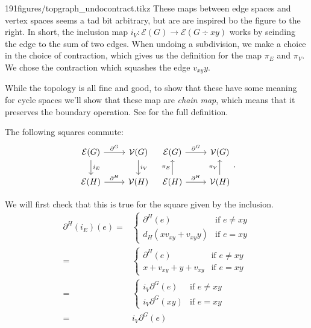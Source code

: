     
\begin{paragraphfigureenv}{191figures/topgraph_undocontract.tikz}
    These maps between edge spaces and vertex spaces seems a tad bit arbitrary, but are are inspired bo the figure to the right. In short, the inclusion map $i_V: \mathcal E(G)\to \mathcal E(G\div xy)$ works by seinding the edge  to the sum of two edges. 
     When undoing a subdivision, we make a choice in the choice of contraction, which gives us the definition for the map $\pi_E$ and $\pi_V$. 
    We chose the contraction which squashes the edge $v_{xy}y$. 
    \end{paragraphfigureenv}
    While the topology is all fine and good, to show that these have some meaning for cycle spaces we'll show that these map are \emph{chain map}, which means that it preserves the boundary operation. See  for the full definition.
    \begin{claim} The following squares commute: \label{claim:graphchainmap}
     \[\begin{tikzcd}
    \mathcal E(G)\arrow{r}{\partial^G} \arrow{d}{i_E} & \mathcal V(G) \arrow{d}{i_V}\\
    \mathcal E(H)\arrow{r}{\partial^H} & \mathcal V(H)
    \end{tikzcd}\;\;\;\begin{tikzcd}
    \mathcal E(G)\arrow{r}{\partial^G}& \mathcal V(G) \\
    \mathcal E(H)\arrow{r}{\partial^H} \arrow{u}{\pi_E}  & \mathcal V(H) \arrow{u}{\pi_V}
    \end{tikzcd}.\]
    \end{claim}
    We will first check that this is true for the square given by the inclusion.\\
    \begin{align*}
    \partial^H(i_E)(e)=& \left\{\begin{array}{ll} \partial^H(e) & \text{if $e\neq xy$}\\  d_H(xv_{xy}+v_{xy}y) & \text{if $e=xy$}\end{array}\right.\\
    =& \left\{\begin{array}{ll} \partial^H(e) & \text{if $e\neq xy$}\\  x+v_{xy}+y+v_{xy} & \text{if $e=xy$}\end{array}\right.\\=& \left\{\begin{array}{ll} i_V\partial^G(e) & \text{if $e\neq xy$}\\  i_V\partial^G(xy) & \text{if $e=xy$}\end{array}\right.\\
    =&i_V\partial^G(e)
    \end{align*}
